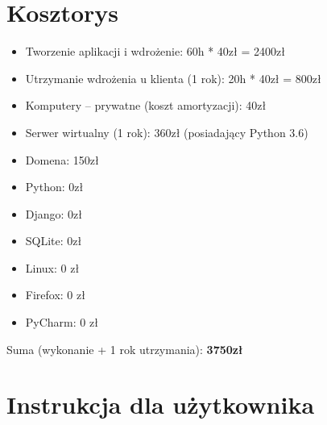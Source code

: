 \documentclass[12pt]{article}
\begin{document}
\section{Kosztorys}
	\begin{itemize}
	\item Tworzenie aplikacji i wdrożenie: 60h * 40zł = 2400zł
	\item Utrzymanie wdrożenia u klienta (1 rok): 20h * 40zł = 800zł
	\item Komputery – prywatne (koszt amortyzacji): 40zł
	\item Serwer wirtualny (1 rok): 360zł (posiadający Python 3.6)
	\item Domena: 150zł
	\item Python: 0zł
	\item Django: 0zł
	\item SQLite: 0zł
	\item Linux: 0 zł
	\item Firefox: 0 zł
	\item PyCharm: 0 zł
\end{itemize}
Suma (wykonanie + 1 rok utrzymania):\textbf{ 3750zł }
\newpage
\section{Instrukcja dla użytkownika}
\end{document}
